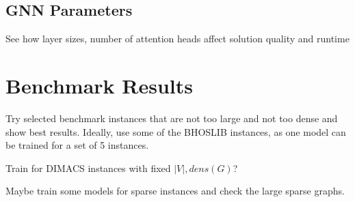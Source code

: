 \documentclass[draft,final]{vutinfth} %
\begin{document}
\subsection{GNN Parameters}
See how layer sizes, number of attention heads affect solution quality and runtime 

\section{Benchmark Results}\label{sec:benchmark-results}
Try selected benchmark instances that are not too large and not too dense and show best results. 
Ideally, use some of the BHOSLIB instances, as one model can be trained for a set of 5 instances. 

Train for DIMACS instances with fixed $|V|, dens(G)$?

Maybe train some models for sparse instances and check the large sparse graphs. 
\end{document}
